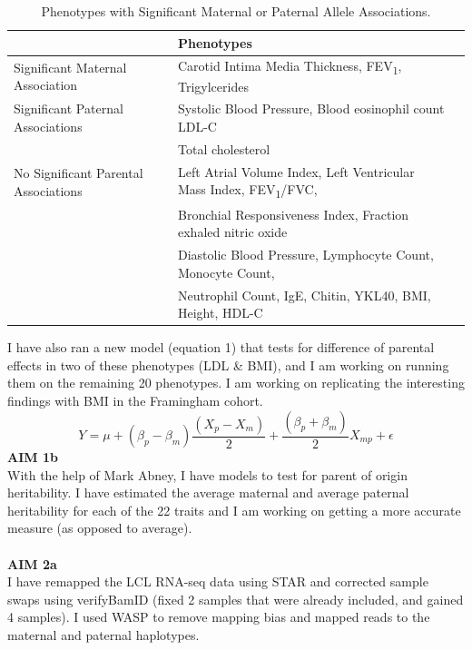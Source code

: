 \documentclass[a4paper, 11pt]{article}
\begin{document}
\begin{table}[!h]
\begin{centering}
\begin{tabular}{lll} \hline
& Phenotypes \\ \hline
Significant Maternal Association & Carotid Intima Media Thickness, FEV\textsubscript{1}, Trigylcerides \\ \hline
Significant Paternal Associations & Systolic Blood Pressure, Blood eosinophil count LDL-C \\ &  Total cholesterol\\ \hline
No Significant Parental Associations & Left Atrial Volume Index, Left Ventricular Mass Index, FEV\textsubscript{1}/FVC,  \\ &  Bronchial Responsiveness Index, Fraction exhaled nitric oxide \\
& Diastolic Blood Pressure, Lymphocyte Count, Monocyte Count, \\
& Neutrophil Count, IgE, Chitin, YKL40, BMI, Height, HDL-C \  \\ \hline 
\end{tabular}
\caption{\label{tab:Signif}Phenotypes with Significant Maternal or Paternal Allele Associations.}
\end{centering}
\end{table}
\newpage
I have also ran a new model (equation 1) that tests for difference of parental effects in two of these phenotypes (LDL \& BMI), and I am working on running them on the remaining 20 phenotypes. I  am working on replicating the interesting findings with BMI in the Framingham cohort.\\
\begin{equation}\label{my_first_eqn}
	Y=\mu + (\beta_p-\beta_m)\frac{(X_p-X_m)}{2} +\frac{(\beta_p+\beta_m)}{2}X_{mp} + \epsilon
\end{equation}
 \textbf{AIM 1b}\\With the help of Mark Abney, I have models to test for parent of origin heritability. I have estimated the average maternal and average paternal heritability for each of the 22 traits and I am working on getting a more accurate measure (as opposed to average).\\
\textbf{\\AIM 2a}\\
I have remapped the LCL RNA-seq data using STAR\cite{Dobin} and corrected sample swaps using verifyBamID (fixed 2 samples that were already included, and gained 4 samples).\cite{Jun} I used WASP\cite{van de Geijn} to remove mapping bias and mapped reads to the maternal and paternal haplotypes.\\
\end{document}
